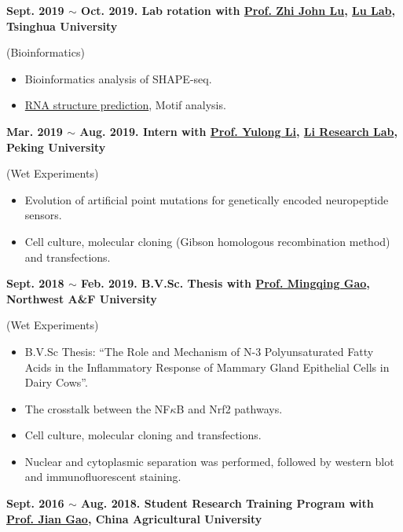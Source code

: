 \textbf{
    Sept. 2019 $\sim$ Oct. 2019. Lab rotation with \href{https://life.tsinghua.edu.cn/lifeen/info/1034/1083.htm}{Prof. Zhi John Lu}, \href{https://lulab.life.tsinghua.edu.cn/labhome/home/}{Lu Lab}, Tsinghua University
}

(Bioinformatics)

\begin{itemize}
    \item Bioinformatics analysis of SHAPE-seq.
    \item \href{https://scholar.google.com/citations?view_op=view_citation&hl=zh-CN&user=ojSVoWQAAAAJ&citation_for_view=ojSVoWQAAAAJ:IjCSPb-OGe4C}{RNA structure prediction}, Motif analysis.
\end{itemize}

\textbf{
    Mar. 2019 $\sim$ Aug. 2019. Intern with \href{https://www.bio.pku.edu.cn/enhomes/news/teacher_dis/43.html}{Prof. Yulong Li}, \href{http://www.yulonglilab.org/}{Li Research Lab}, Peking University
}

(Wet Experiments)

\begin{itemize}
    \item Evolution of artificial point mutations for genetically encoded neuropeptide sensors.
    \item Cell culture, molecular cloning (Gibson homologous recombination method) and transfections.
\end{itemize}

\textbf{
    Sept. 2018 $\sim$ Feb. 2019. B.V.Sc. Thesis with \href{https://faculty.nwu.edu.cn/gaomingqing/en/index.htm}{Prof. Mingqing Gao}, Northwest A\&F University
}

(Wet Experiments)

\begin{itemize}
    \item B.V.Sc Thesis: ``The Role and Mechanism of N-3 Polyunsaturated Fatty Acids in the Inflammatory Response of Mammary Gland Epithelial Cells in Dairy Cows''.
    \item The crosstalk between the NF$\kappa$B and Nrf2 pathways.
    \item Cell culture, molecular cloning and transfections.
    \item Nuclear and cytoplasmic separation was performed, followed by western blot and immunofluorescent staining.
\end{itemize}

\textbf{
    Sept. 2016 $\sim$ Aug. 2018. Student Research Training Program with \href{https://cvm.cau.edu.cn/art/2017/9/12/art_41957_71.html}{Prof. Jian Gao}, China Agricultural University
}

